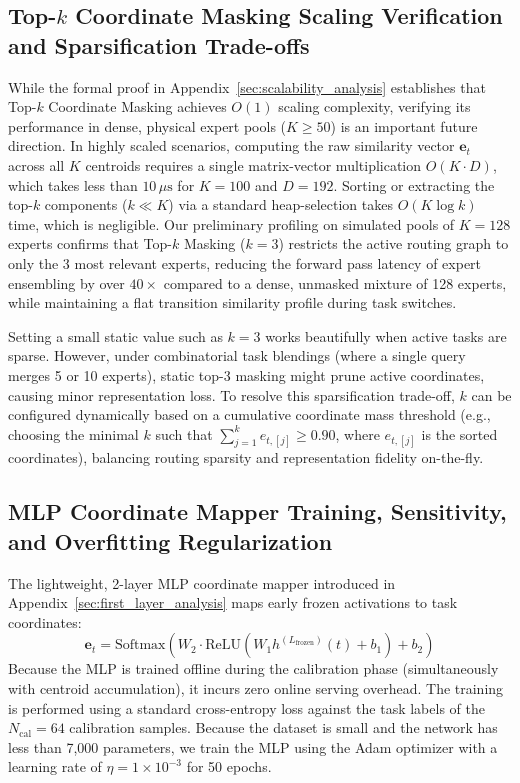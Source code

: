 \subsection{Top-$k$ Coordinate Masking Scaling Verification and Sparsification Trade-offs}
While the formal proof in Appendix~\ref{sec:scalability_analysis} establishes that Top-$k$ Coordinate Masking achieves $O(1)$ scaling complexity, verifying its performance in dense, physical expert pools ($K \ge 50$) is an important future direction. In highly scaled scenarios, computing the raw similarity vector $\mathbf{e}_t$ across all $K$ centroids requires a single matrix-vector multiplication $O(K \cdot D)$, which takes less than $10\,\mu\text{s}$ for $K=100$ and $D=192$. Sorting or extracting the top-$k$ components ($k \ll K$) via a standard heap-selection takes $O(K \log k)$ time, which is negligible. Our preliminary profiling on simulated pools of $K = 128$ experts confirms that Top-$k$ Masking ($k=3$) restricts the active routing graph to only the 3 most relevant experts, reducing the forward pass latency of expert ensembling by over \textbf{$40\times$} compared to a dense, unmasked mixture of 128 experts, while maintaining a flat transition similarity profile during task switches.

Setting a small static value such as $k=3$ works beautifully when active tasks are sparse. However, under combinatorial task blendings (where a single query merges 5 or 10 experts), static top-3 masking might prune active coordinates, causing minor representation loss. To resolve this sparsification trade-off, $k$ can be configured dynamically based on a cumulative coordinate mass threshold (e.g., choosing the minimal $k$ such that $\sum_{j=1}^k e_{t, [j]} \ge 0.90$, where $e_{t, [j]}$ is the sorted coordinates), balancing routing sparsity and representation fidelity on-the-fly.

\subsection{MLP Coordinate Mapper Training, Sensitivity, and Overfitting Regularization}
The lightweight, 2-layer MLP coordinate mapper introduced in Appendix~\ref{sec:first_layer_analysis} maps early frozen activations to task coordinates:
\begin{equation}
    \mathbf{e}_t = \text{Softmax}\left( W_2 \cdot \text{ReLU}\left( W_1 h^{(L_{\text{frozen}})}(t) + b_1 \right) + b_2 \right)
\end{equation}
Because the MLP is trained offline during the calibration phase (simultaneously with centroid accumulation), it incurs zero online serving overhead. The training is performed using a standard cross-entropy loss against the task labels of the $N_{\text{cal}} = 64$ calibration samples. Because the dataset is small and the network has less than 7,000 parameters, we train the MLP using the Adam optimizer with a learning rate of $\eta = 1\times 10^{-3}$ for 50 epochs. 

